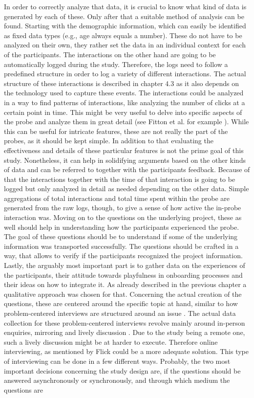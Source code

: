 In order to correctly analyze that data, it is crucial to know what kind of data is generated by each of these. Only after that a suitable method of analysis can be found. Starting with the demographic information, which can easily be identified as fixed data types (e.g., age always equals a number). These do not have to be analyzed on their own, they rather set the data in an individual context for each of the participants. The interactions on the other hand are going to be automatically logged during the study. Therefore, the logs need to follow a predefined structure in order to log a variety of different interactions. The actual structure of these interactions is described in chapter 4.3 as it also depends on the technology used to capture these events. The interactions could be analyzed in a way to find patterns of interactions, like analyzing the number of clicks at a certain point in time. This might be very useful to delve into specific aspects of the probe and analyze them in great detail (see Fitton et al. for example \cite{fitton2004probing}). While this can be useful for intricate features, these are not really the part of the probes, as it should be kept simple. In addition to that evaluating the effectiveness and details of these particular features is not the prime goal of this study. Nonetheless, it can help in solidifying arguments based on the other kinds of data and can be referred to together with the participants feedback. Because of that the interactions together with the time of that interaction is going to be logged but only analyzed in detail as needed depending on the other data. Simple aggregations of total interactions and total time spent within the probe are generated from the raw logs, though, to give a sense of how active the in-probe interaction was. Moving on to the questions on the underlying project, these as well should help in understanding how the participants experienced the probe. The goal of these questions should be to understand if some of the underlying information was transported successfully. The questions should be crafted in a way, that allows to verify if the participants recognized the project information. Lastly, the arguably most important part is to gather data on the experiences of the participants, their attitude towards playfulness in onboarding processes and their ideas on how to integrate it. As already described in the previous chapter a qualitative approach was chosen for that. Concerning the actual creation of the questions, these are centered around the specific topic at hand, similar to how problem-centered interviews are structured around an issue \cite{witzel2012problem}. The actual data collection for these problem-centered interviews revolve mainly around in-person enquiries, mirroring and lively discussion \cite[p. 232-236]{flick2018introduction}. Due to the study being a remote one, such a lively discussion might be at harder to execute. Therefore online interviewing, as mentioned by Flick \cite[p. 243]{flick2018introduction} could be a more adequate solution. This type of interviewing can be done in a few different ways. Probably, the two most important decisions concerning the study design are, if the questions should be answered asynchronously or synchronously, and through which medium the questions are 